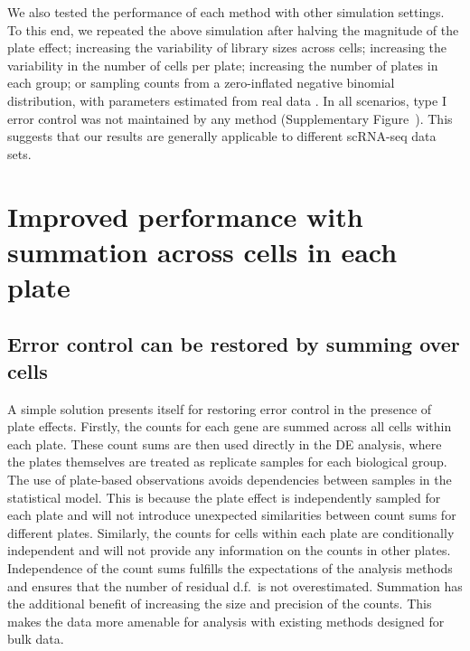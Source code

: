 \documentclass[oupdraft]{bio}
\begin{document}
We also tested the performance of each method with other simulation settings.
To this end, we repeated the above simulation after halving the magnitude of the plate effect; increasing the variability of library sizes across cells; increasing the variability in the number of cells per plate; increasing the number of plates in each group; or sampling counts from a zero-inflated negative binomial distribution, with parameters estimated from real data \citep{zeilis2008regression}.
In all scenarios, type I error control was not maintained by any method (Supplementary Figure~\suppfailsim{}).
This suggests that our results are generally applicable to different scRNA-seq data sets.

\section{Improved performance with summation across cells in each plate}

\subsection{Error control can be restored by summing over cells}
A simple solution presents itself for restoring error control in the presence of plate effects.
Firstly, the counts for each gene are summed across all cells within each plate.
These count sums are then used directly in the DE analysis, where the plates themselves are treated as replicate samples for each biological group.
The use of plate-based observations avoids dependencies between samples in the statistical model.
This is because the plate effect is independently sampled for each plate and will not introduce unexpected similarities between count sums for different plates.
Similarly, the counts for cells within each plate are conditionally independent and will not provide any information on the counts in other plates.
Independence of the count sums fulfills the expectations of the analysis methods and ensures that the number of residual d.f.\ is not overestimated.
Summation has the additional benefit of increasing the size and precision of the counts.
This makes the data more amenable for analysis with existing methods designed for bulk data.

\end{document}
